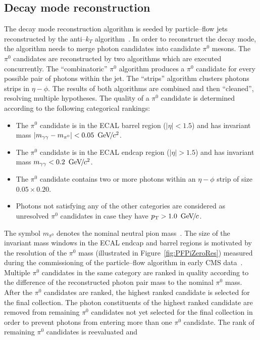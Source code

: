 \subsection{Decay mode reconstruction}
%
The decay mode reconstruction algorithm is seeded by particle--flow jets
reconstructed by the anti--$k_{T}$ algorithm~\cite{AntiKT}.  In order to
reconstruct the decay mode, the algorithm needs to merge photon candidates into
candidate $\pi^0$ mesons.  The $\pi^0$ candidates are reconstructed by two
algorithms which are executed concurrently.  The ``combinatoric'' $\pi^0$
algorithm produces a $\pi^0$ candidate for every possible pair of photons within
the jet.  The ``strips'' algorithm clusters photons strips in $\eta-\phi$.  The
results of both algorithms are combined and then ``cleaned'', resolving multiple
hypotheses.  The quality of a $\pi^0$ candidate is determined according to the
following categorical rankings:
\begin{itemize}
\item The $\pi^0$ candidate is in the ECAL barrel region ($|\eta| < 1.5$) 
and has invariant mass $|m_{\gamma \gamma} - m_{\pi^0}| < 0.05~{\,\text{Ge\hspace{-.08em}V\hspace{-0.16em}/\hspace{-0.08em}}c^\text{2}}$.
\item The $\pi^0$ candidate is in the ECAL endcap region ($|\eta| > 1.5$)
 and has invariant mass $m_{\gamma \gamma} < 0.2~{\,\text{Ge\hspace{-.08em}V\hspace{-0.16em}/\hspace{-0.08em}}c^\text{2}}$.
\item The $\pi^0$ candidate contains two or more photons within an $\eta-\phi$ strip of size $0.05 \times 0.20$.
\item Photons not satisfying any of the other categories are considered as
  unresolved $\pi^0$ candidates in case they have $p_{\mathrm{T}} > 1.0~{\,\text{Ge\hspace{-.08em}V\hspace{-0.16em}/\hspace{-0.08em}}c}$.
\end{itemize}  
The symbol $m_{\pi^0}$ denotes the nominal neutral pion mass~\cite{PDG}.  The
size of the invariant mass windows in the ECAL endcap and barrel regions is
motivated by the resolution of the $\pi^0$ mass (illustrated in
Figure~\ref{fig:PFPiZeroRes}) measured during the commissioning of the
particle--flow algorithm in early CMS data~\cite{CMS-PAS-PFT-10-002}.  Multiple
$\pi^0$ candidates in the same category are ranked in quality according to the
difference of the reconstructed photon pair mass to the nominal $\pi^0$ mass.
After the $\pi^0$ candidates are ranked, the highest ranked candidate is
selected for the final collection.  The photon constituents of the highest
ranked candidate are removed from remaining $\pi^0$ candidates not yet selected
for the final collection in order to prevent photons from entering more than one
$\pi^0$ candidate.  The rank of remaining $\pi^0$ candidates is reevaluated and
